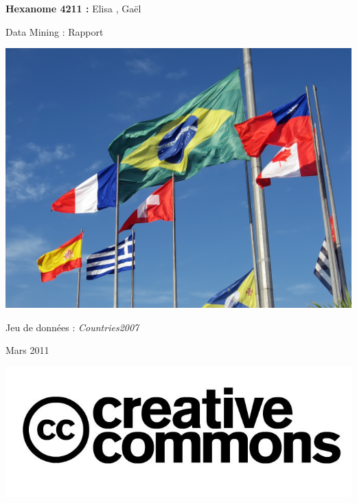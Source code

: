 \documentclass[a4paper]{article}
\begin{document}
\begin{titlepage}
\begin{center}
 
 \vfill
		\begin{Large}\textbf{Hexanome 4211 :} 
		Elisa , Gaël \end{Large}
		
\vfill
	
		\begin{Huge}
		Data Mining : Rapport \\
		\end{Huge} 

\vfill
	
		 
		\includegraphics[scale=0.3]{Image/drapeaux-du-monde}
\begin{Large}
		
		
		Jeu de données :  \textit{Countries2007}\\
		\end{Large}

\vfill		
		\begin{Large}
		Mars 2011
		\end{Large}
		\includegraphics[scale=0.1]{Image/creative_commons}
	\end{center}
	

\end{titlepage}
\end{document}
